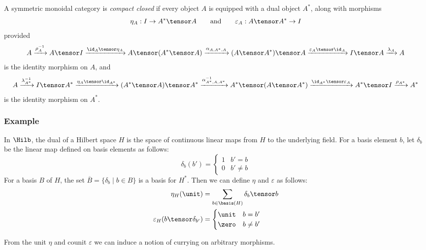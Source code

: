 \begin{definition}
A symmetric monoidal category is \emph{compact closed} if every object $A$ is
equipped with a dual object $A^*$, along with morphisms
\[ \eta_A : I \rightarrow A^* \tensor A \qquad\text{and}\qquad
   \varepsilon_A : A \tensor A^* \rightarrow I \]
provided
\[
    A \xrightarrow{\rho_A^{-1}} A \tensor I
    \xrightarrow{\id_A \tensor \eta_A} A\tensor(A^* \tensor A)
    \xrightarrow{\alpha_{A,A^*,A}} (A \tensor A^*)\tensor A
    \xrightarrow{\varepsilon_A \tensor \id_A} I \tensor A
    \xrightarrow{\lambda_A} A
\]
is the identity morphism on $A$, and
\[
    A \xrightarrow{\lambda_{A^*}^{-1}} I \tensor A^*
    \xrightarrow{\eta_A \tensor \id_{A^*}} (A^* \tensor A) \tensor A^*
    \xrightarrow{\alpha_{A^*,A,A^*}^{-1}} A^* \tensor (A \tensor A^*) 
    \xrightarrow{\id_{A^*} \tensor \varepsilon_A} A^* \tensor I
    \xrightarrow{\rho_{A^*}} A^*
\]
is the identity morphism on $A^*$.
\end{definition}

\subsubsection*{Example} In $\Hilb$, the dual
of a Hilbert space $H$ is the space of continuous linear maps from $H$
to the underlying field. For a basis element $b$, let $\delta_b$
be the linear map defined on basis elements as follows:
\[ \delta_b(b') = \begin{cases}
    1 &b'=b \\
    0 &b' \neq b
\end{cases}\]
For a basis $B$ of $H$, the set $\overline{B} = \{\delta_b \mid b \in B\}$
is a basis for $H^*$. Then we can define $\eta$ and $\varepsilon$ as follows:
\begin{align*}
    \eta_H(\unit) &= \sum_{b \in \basis(H)} \delta_b \tensor b \\
    \varepsilon_H(b \tensor \delta_{b'}) &= 
        \begin{cases}   
            \unit &b = b' \\
            \zero &b \neq b'
        \end{cases}
\end{align*}

From the unit $\eta$ and counit $\varepsilon$ we can induce a notion of currying
on arbitrary morphisms.


